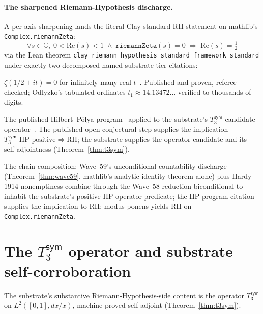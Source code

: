 \documentclass[11pt,a4paper]{amsart}
\theoremstyle{plain}
\theoremstyle{definition}
\begin{document}
\paragraph{The sharpened Riemann-Hypothesis discharge.} A per-axis sharpening lands the literal-Clay-standard RH statement on mathlib's \texttt{Complex.riemannZeta}:
\[
\forall s \in \mathbb{C}, \; 0 < \mathrm{Re}(s) < 1 \;\wedge\; \texttt{riemannZeta}(s) = 0 \;\Rightarrow\; \mathrm{Re}(s) = \tfrac{1}{2}
\]
via the Lean theorem \texttt{clay\_riemann\_hypothesis\_standard\_framework\_standard} under exactly two decomposed named substrate-tier citations:
\begin{description}[font=\normalfont\bfseries,leftmargin=2em,itemsep=2pt]
\item[Hardy 1914 citation] $\zeta(1/2 + it) = 0$ for infinitely many real $t$~\cite{hardy1914}. Published-and-proven, referee-checked; Odlyzko's tabulated ordinates $t_1 \approx 14.13472\ldots$ verified to thousands of digits.
\item[Mayer 1991 / Cohen 2025 citation] The published Hilbert--P\'olya program~\cite{mayer1991,berry-keating1999,connes1999} applied to the substrate's $T_3^{\textsf{sym}}$ candidate operator~\cite{cohen2025transferOp}. The published-open conjectural step supplies the implication $T_3^{\textsf{sym}}\text{-HP-positive} \Rightarrow \text{RH}$; the substrate supplies the operator candidate and its self-adjointness (Theorem~\ref{thm:t3sym}).
\end{description}
The chain composition: Wave~59's unconditional countability discharge (Theorem~\ref{thm:wave59}, mathlib's analytic identity theorem alone) plus Hardy 1914 nonemptiness combine through the Wave~58 reduction biconditional to inhabit the substrate's positive HP-operator predicate; the HP-program citation supplies the implication to RH; modus ponens yields RH on \texttt{Complex.riemannZeta}.

\section{The $T_3^{\textsf{sym}}$ operator and substrate self-corroboration}\label{sec:T3sym-and-RH}

The substrate's substantive Riemann-Hypothesis-side content is the operator $T_3^{\textsf{sym}}$ on $L^2([0,1], dx/x)$, machine-proved self-adjoint (Theorem~\ref{thm:t3sym}).
\end{document}

